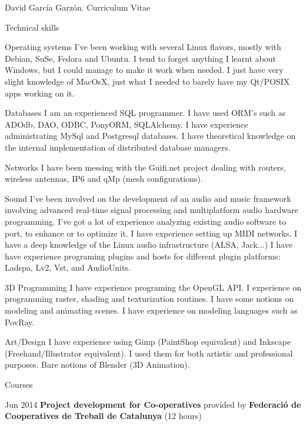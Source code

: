 \documentclass{article}
\begin{document}
\begin{cv}{David García Garzón. Curriculum Vitae}
\begin{cvlist}{Technical skills}
\item[Operating systems]
	I've been working with several Linux flavors, mostly with Debian, SuSe, Fedora and Ubuntu.
I tend to forget anything I learnt about Windows, but I could manage to make it work when needed.
I just have very slight knowledge of MacOsX, just what I needed to barely have my Qt/POSIX apps working on it.


\item[Databases]
	I am an experienced SQL programmer.
I have used ORM's such as ADOdb, DAO, ODBC, PonyORM, SQLAlchemy.
I have experience administrating MySql and Postgresql databases.
I have theoretical knowledge on the internal implementation of distributed database managers.


\item[Networks]
	I have been messing with the Guifi.net project dealing with routers, wireless antennas, IP6 and qMp (mesh configurations).


\item[Sound]
	I've been involved on the development of an audio and music framework
involving advanced real-time signal processing and
multiplatform audio hardware programming.
I've got a lot of experience analyzing existing audio software to port, to enhance or to optimize it.
I have experience setting up MIDI networks.
I have a deep knowledge of the Linux audio infrastructure (ALSA, Jack...)
I have have experience programing plugins and hosts for different plugin platforms: Ladspa, Lv2, Vst, and AudioUnits.


\item[3D Programming]
	I have experience programing the OpenGL API.
I experience on programming raster, shading and texturization routines.
I have some notions on modeling and animating scenes.
I have experience on modeling languages such as PovRay.


\item[Art/Design]
	I have experience using Gimp (PaintShop equivalent) and Inkscape (Freehand/Illustrator equivalent).
I used them for both artistic and professional purposes.
Bare notions of Blender (3D Animation).


\end{cvlist}

\begin{cvlist}{Courses}

\item[Jun 2014]
	{\bf Project development for Co-operatives } provided by {\bf Federació de Cooperatives de Treball de Catalunya} (12 hours)


\end{cvlist}
\end{cv}
\end{document}
